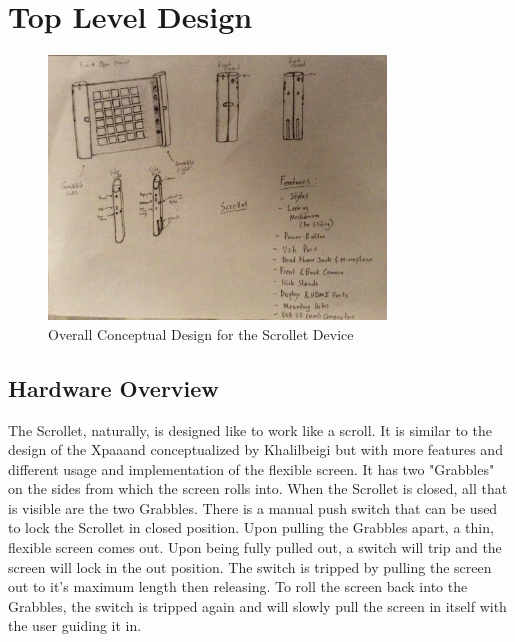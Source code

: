 \documentclass[a4paper]{article}
\begin{document}
\section{Top Level Design}
\begin{figure}[H]
\centering
\includegraphics[width=0.8\textwidth]{scrollet-scan.jpeg}
\caption{Overall Conceptual Design for the Scrollet Device}
\end{figure}
\subsection{Hardware Overview}
The Scrollet, naturally, is designed like to work like a scroll. It is similar to the design of the Xpaaand conceptualized by Khalilbeigi but with more features and different usage and implementation of the flexible screen. \cite{Khalilbeigi} It has two "Grabbles" on the sides from which the screen rolls into. When the Scrollet is closed, all that is visible are the two Grabbles. There is a manual push switch that can be used to lock the Scrollet in closed position. Upon pulling the Grabbles apart, a thin, flexible screen comes out. Upon being fully pulled out, a switch will trip and the screen will lock in the out position. The switch is tripped by pulling the screen out to it's maximum length then releasing. To roll the screen back into the Grabbles, the switch is tripped again and will slowly pull the screen in itself with the user guiding it in.
\end{document}

